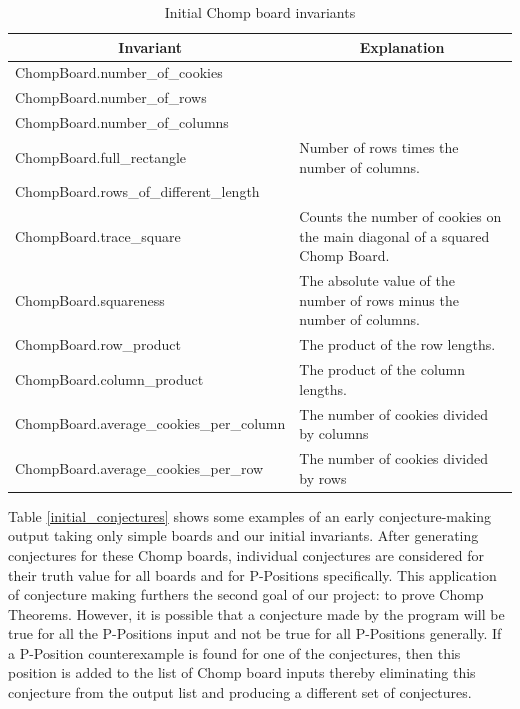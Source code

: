 \documentclass{amsart}
\theoremstyle{definition}
\theoremstyle{remark}
\numberwithin{equation}{section}
\begin{document}
\begin{table}[h]
\centering
\begin{tabular}{@{}|l|p{7cm}|@{}}
\toprule
\multicolumn{1}{|c|}{{\bf Invariant}} & \multicolumn{1}{c|}{{\bf Explanation}} \\ \midrule
ChompBoard.number\_of\_cookies &  \\
\hline
ChompBoard.number\_of\_rows &  \\
\hline
ChompBoard.number\_of\_columns &  \\
\hline
ChompBoard.full\_rectangle & Number of rows times the number of columns. \\
\hline
ChompBoard.rows\_of\_different\_length &  \\
\hline
ChompBoard.trace\_square & Counts the number of cookies on the main diagonal of a squared Chomp Board. \\
\hline
ChompBoard.squareness & The absolute value of the number of rows minus the number of columns. \\
\hline
ChompBoard.row\_product & The product of the row lengths. \\
\hline
ChompBoard.column\_product & The product of the column lengths. \\
\hline
ChompBoard.average\_cookies\_per\_column & The number of cookies divided by columns \\
\hline
ChompBoard.average\_cookies\_per\_row & The number of cookies divided by rows\\
\hline
\end{tabular}
\caption{Initial Chomp board invariants}
\label{initial_invariants}
\end{table}










  Table \ref{initial_conjectures} shows some examples of an early conjecture-making output taking only simple boards and our initial invariants. After generating conjectures for these Chomp boards, individual conjectures are considered for their truth value for all boards and for P-Positions specifically. This application of conjecture making furthers the second goal of our project: to prove Chomp Theorems. However, it is possible that a conjecture made by the program will be true for all the P-Positions input and not be true for all P-Positions generally. If a P-Position counterexample is found for one of the conjectures, then this position is added to the list of Chomp board inputs thereby eliminating this conjecture from the output list and producing a different set of conjectures. 
  
\end{document}
